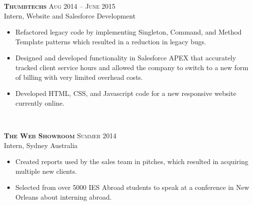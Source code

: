 \documentclass[10pt]{article} %
\begin{document}
{\raggedright

\large \textsc{\textbf{Thumbtechs}} \hfill \small{\textsc{Aug 2014 -- June 2015}}\\
Intern, Website and Salesforce Development}
\normalsize{
\begin{itemize}
\item Refactored legacy code by implementing Singleton, Command, and Method Template patterns which resulted in a reduction in legacy bugs.
\item Designed and developed functionality in Salesforce APEX that accurately tracked client service hours and allowed the company to switch to a new form of billing with very limited overhead costs.
\item Developed HTML, CSS, and Javascript code for a new responsive website currently online.
\end{itemize}
}\\
\hfill

{\raggedright \large \textsc{\textbf{The Web Showroom}} \hfill \small{\textsc{Summer 2014}}\\
Intern, Sydney Australia}
\normalsize{
\begin{itemize}
	\item Created reports used by the sales team in pitches, which resulted in acquiring multiple new clients.
	\item Selected from over 5000 IES Abroad students to speak at a conference in New Orleans about interning abroad.
\end{itemize}
}\\
\hfill

\end{document}
